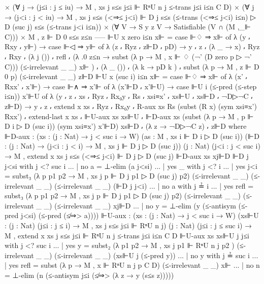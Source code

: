\begin{spverbatim}
        × (∀ j → (j≤i : j ≤ iu) → M , xs j {s≤s j≤i} ⊩ RⁿU n j {≤-trans j≤i i≤n} {C} {D})
        × (∀ j → (j<i : j < iu) → M , xs j {s≤s (<⇒≤ j<i)} ⊩ D j {s≤s (≤-trans (<⇒≤ j<i) i≤n)} ▷ D (suc j) {s≤s (≤-trans j<i i≤n)})
        × (∀ {V} → S y z V → Satisfiable (V ∩ (M ,_⊩ C)))
        × M , z ⊩ D 0 {s≤s z≤n}
      -----
    ⊩U {x} zero i≤n x⊩ = case ⊩♢ ⇒ x⊩ of
      λ { (y ⸴ Rxy ⸴ y⊩) → case ⊩◁ ⇒ y⊩ of λ { (z ⸴ Ryz ⸴ z⊩D ⸴ pD)
      → y ⸴ z ⸴ (λ {_ → x}) ⸴ Ryz ⸴ Rxy ⸴ (λ {j ()}) ⸴ refl ⸴
      (λ { .0 z≤n → subst (λ p → M , x ⊩ ♢ (¬' (D zero {p} ▷ ¬' C)))
        (≤-irrelevant _ _) x⊩ }) ⸴
        (λ {_ ()}) ⸴
        (λ {k → pD k }) ⸴ subst (λ p → M , z ⊩ D 0 {p})
          (≤-irrelevant _ _) z⊩D
      }}
    ⊩U {x} (suc i) i≤n x⊩ = case ⊩♢ ⇒ x⊩ of λ { (x' ⸴ Rxx' ⸴ x'⊩) → case ⊩∧ ⇒ x'⊩ of
      λ { (x'⊩D ⸴ x'⊩U) → case ⊩U i (≤-pred (≤-step i≤n)) x'⊩U of
      λ { (y ⸴ z ⸴ xs ⸴ Ryz ⸴ Rx₀y ⸴ Rs ⸴ xsi≡x' ⸴ xs⊩U ⸴ xs⊩D ⸴ ¬D▷¬C ⸴ z⊩D)
      → y ⸴ z ⸴ extend x xs ⸴ Ryz ⸴ Rx₀y ⸴
        R-aux xs Rs (subst (R x) (sym xsi≡x') Rxx') ⸴
        extend-last x xs ⸴ ⊩U-aux xs xs⊩U ⸴ ⊩D-aux xs (subst (λ p → M , p ⊩ D i ▷ D (suc i)) (sym xsi≡x') x'⊩D) xs⊩D ⸴
        (λ {z → ¬D▷¬C z}) ⸴ z⊩D
        }}}
        where
        ⊩D-aux : (xs : (j : Nat) → {j < suc i} → W)
          (as : M , xs i ⊩ D i ▷ D (suc i))
          (⊩D : (j : Nat) → (j<i : j < i) → M , xs j ⊩ D j ▷ D (suc j))
          (j : Nat) (j<i : j < suc i)
          → M , extend x xs j {s≤s (<⇒≤ j<i)} ⊩ D j ▷ D (suc j)
        ⊩D-aux xs xj⊩D ⊩D j j<si with j <? suc i
        ... | no a = ⊥-elim (a j<si)
        ... | yes _ with j <? i
        ... | yes j<i = subst₃ (λ p p1 p2 → M , xs j {p} ⊩ D j {p1} ▷ D (suc j) {p2})
            (≤-irrelevant _ _) (≤-irrelevant _ _) (≤-irrelevant _ _) (⊩D j j<i)
        ... | no a with j ≟ i
        ... | yes refl = subst₃ (λ p p1 p2 → M , xs j {p} ⊩ D j {p1} ▷ D (suc j) {p2})
            (≤-irrelevant _ _) (≤-irrelevant _ _) (≤-irrelevant _ _) xj⊩D
        ... | no y = ⊥-elim (y (≤-antisym (≤-pred j<si) (≤-pred (≰⇒> a))))
        ⊩U-aux : (xs : (j : Nat) → {j < suc i} → W)
          (xs⊩U : (j : Nat) (j≤i : j ≤ i) → M , xs j {s≤s j≤i} ⊩ RⁿU n j)
          (j : Nat) (j≤i : j ≤ suc i)
          → M , extend x xs j {s≤s j≤i} ⊩ RⁿU n j {≤-trans j≤i i≤n} {C} {D}
        ⊩U-aux xs xs⊩U j j≤i with j <? suc i
        ... | yes y = subst₂ (λ p1 p2 → M , xs j {p1} ⊩ RⁿU n j {p2} ) (≤-irrelevant _ _) (≤-irrelevant _ _) (xs⊩U j (≤-pred y))
        ... | no y with j ≟ suc i
        ... | yes refl = subst (λ p → M , x ⊩ RⁿU n j {p} {C} {D}) (≤-irrelevant _ _) x⊩
        ... | no n = ⊥-elim (n (≤-antisym j≤i (≰⇒> (λ z → y (s≤s z)))))

\end{spverbatim}
